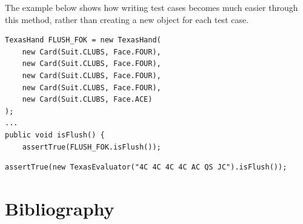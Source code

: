 \documentclass[11pt]{article}
\begin{document}
The example below shows how writing test cases becomes much easier through this method, rather than creating a new object for each test case.

\begin{minipage}{.5\textwidth}

\begin{lstlisting}
TexasHand FLUSH_FOK = new TexasHand(
    new Card(Suit.CLUBS, Face.FOUR),
    new Card(Suit.CLUBS, Face.FOUR),
    new Card(Suit.CLUBS, Face.FOUR),
    new Card(Suit.CLUBS, Face.FOUR),
    new Card(Suit.CLUBS, Face.ACE)
);
...
public void isFlush() {
    assertTrue(FLUSH_FOK.isFlush());
\end{lstlisting}
\end{minipage}
\begin{minipage}{.5\textwidth}

\begin{lstlisting}[breaklines=true]
assertTrue(new TexasEvaluator("4C 4C 4C 4C AC QS JC").isFlush());
\end{lstlisting}
\end{minipage}


\section{Bibliography}
\end{document}
